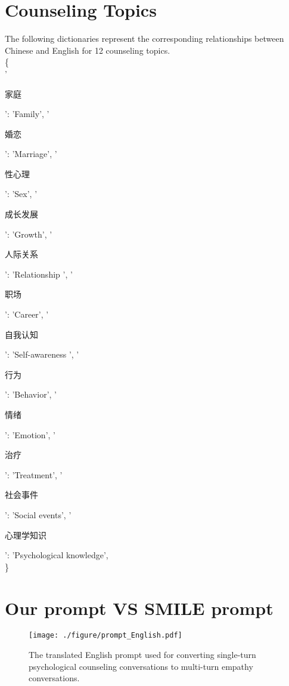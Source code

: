 \documentclass[11pt]{article}
\begin{document}
\section{Counseling Topics}
\label{sec:counseling_topics}
The following dictionaries represent the corresponding relationships between Chinese and English for 12 counseling topics.\\
\{\\
    '\begin{CJK}{UTF8}{gbsn}家庭\end{CJK}': 'Family',
    '\begin{CJK}{UTF8}{gbsn}婚恋\end{CJK}': 'Marriage',
    '\begin{CJK}{UTF8}{gbsn}性心理\end{CJK}': 'Sex',
    '\begin{CJK}{UTF8}{gbsn}成长发展\end{CJK}': 'Growth', 
    '\begin{CJK}{UTF8}{gbsn}人际关系\end{CJK}': 'Relationship ',
    '\begin{CJK}{UTF8}{gbsn}职场\end{CJK}': 'Career',
    '\begin{CJK}{UTF8}{gbsn}自我认知\end{CJK}': 'Self-awareness ',
    '\begin{CJK}{UTF8}{gbsn}行为\end{CJK}': 'Behavior',
    '\begin{CJK}{UTF8}{gbsn}情绪\end{CJK}': 'Emotion',
    '\begin{CJK}{UTF8}{gbsn}治疗\end{CJK}': 'Treatment',
    '\begin{CJK}{UTF8}{gbsn}社会事件\end{CJK}': 'Social events',
    '\begin{CJK}{UTF8}{gbsn}心理学知识\end{CJK}': 'Psychological knowledge',\\
\}

\section{Our prompt VS SMILE prompt}
\label{sec:prompt_analysis}

\begin{figure}[htbp]
  \centering
  \texttt{[image: ./figure/prompt\_English.pdf]}
  \caption{The translated English prompt used for converting single-turn psychological counseling conversations to multi-turn empathy conversations. 
}
  \label{prompt_english}
\end{figure}
\end{document}
